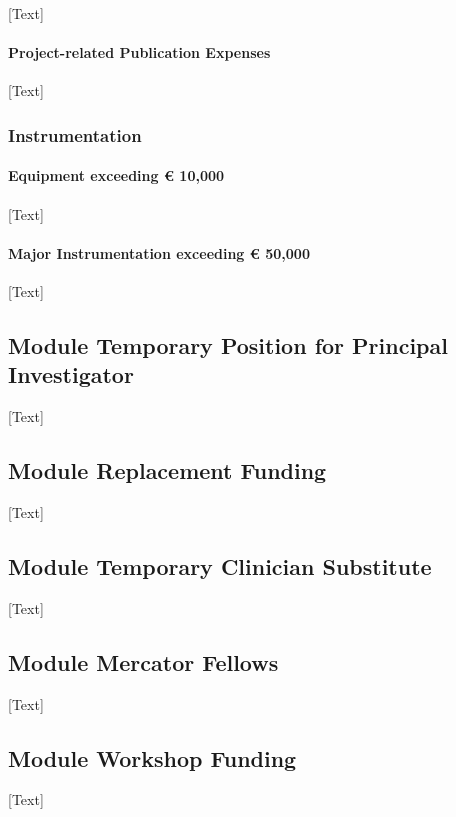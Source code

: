 \documentclass[a4paper,11pt]{article}
\begin{document}
[Text]

\paragraph{Project-related Publication Expenses}

[Text]

\subsubsection{Instrumentation}

\paragraph{Equipment exceeding € 10,000}

[Text]

\paragraph{Major Instrumentation exceeding € 50,000}

[Text]

\subsection{Module Temporary Position for Principal Investigator}

[Text]

\subsection{Module Replacement Funding}

[Text]

\subsection{Module Temporary Clinician Substitute}

[Text]

\subsection{Module Mercator Fellows}

[Text]

\subsection{Module Workshop Funding}

[Text]
\end{document}
